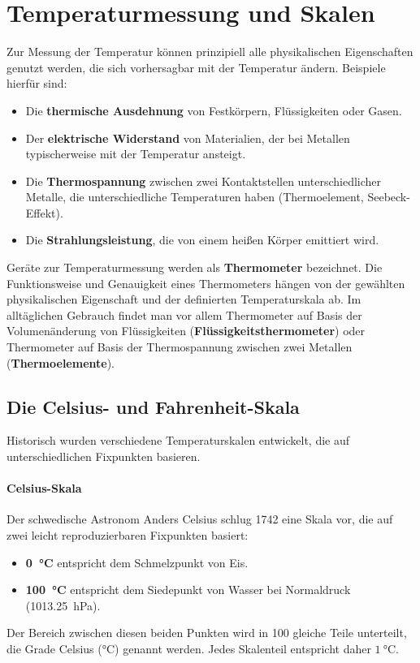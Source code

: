 \section{Temperaturmessung und Skalen}\label{sec: Temperaturmessung_Skalen}
Zur Messung der Temperatur können prinzipiell alle physikalischen Eigenschaften genutzt werden, die sich vorhersagbar mit der Temperatur ändern. Beispiele hierfür sind:
\begin{itemize}[itemsep=1.5pt]
    \item Die \textbf{thermische Ausdehnung} von Festkörpern, Flüssigkeiten oder Gasen.
    \item Der \textbf{elektrische Widerstand} von Materialien, der bei Metallen typischerweise mit der Temperatur ansteigt.
    \item Die \textbf{Thermospannung} zwischen zwei Kontaktstellen unterschiedlicher Metalle, die unterschiedliche Temperaturen haben (Thermoelement, Seebeck-Effekt).
    \item Die \textbf{Strahlungsleistung}, die von einem heißen Körper emittiert wird.
\end{itemize}
Geräte zur Temperaturmessung werden als \textbf{Thermometer} bezeichnet. Die Funktionsweise und Genauigkeit eines Thermometers hängen von der gewählten physikalischen Eigenschaft und der definierten Temperaturskala ab. Im alltäglichen Gebrauch findet man vor allem Thermometer auf Basis der Volumenänderung von Flüssigkeiten (\textbf{Flüssigkeitsthermometer}) oder Thermometer auf Basis der Thermospannung zwischen zwei Metallen (\textbf{Thermoelemente}). 

\subsection{Die Celsius- und Fahrenheit-Skala}\label{subsec: Celsius_Fahrenheit}
Historisch wurden verschiedene Temperaturskalen entwickelt, die auf unterschiedlichen Fixpunkten basieren.

\paragraph{Celsius-Skala}
Der schwedische Astronom Anders Celsius schlug 1742 eine Skala vor, die auf zwei leicht reproduzierbaren Fixpunkten basiert:
\begin{itemize}
    \item \textbf{\SI{0}{\celsius}} entspricht dem Schmelzpunkt von Eis.
    \item \textbf{\SI{100}{\celsius}} entspricht dem Siedepunkt von Wasser bei Normaldruck (\SI{1013.25}{\hecto\pascal}).
\end{itemize}
Der Bereich zwischen diesen beiden Punkten wird in 100 gleiche Teile unterteilt, die Grade Celsius ($\si{\celsius}$) genannt werden. Jedes Skalenteil entspricht daher $\SI{1}{\celsius}$.

